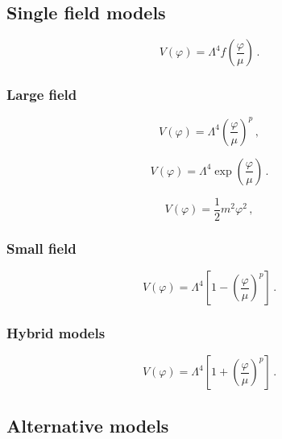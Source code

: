 \subsection{Single field models} 
\label{subsection:2.4.1}

\begin{equation}
V(\varphi) = \Lambda^4 f\left(\frac{\varphi}{\mu}\right)\, .
\label{equation:2.4.1}
\end{equation}  

\subsubsection{Large field}
\label{subsubsection:2.4.1.1}

\begin{equation}
V(\varphi) = \Lambda^4 \left( \frac{\varphi}{\mu} \right)^p \, ,
\label{equation:2.4.2}
\end{equation}     

\begin{equation}
V(\varphi) = \Lambda^4 \exp \left( \frac{\varphi}{\mu} \right) \, .
\label{equation:2.4.3}
\end{equation}

\begin{equation}
V(\varphi) = \frac{1}{2} m^2 \varphi^2 \, ,
\label{equation:2.4.4}
\end{equation} 

\subsubsection{Small field}
\label{subsubsection:2.4.1.2}

\begin{equation}
V(\varphi) = \Lambda^4 \left[ 1 - \left( \frac{\varphi}{\mu} \right)^p \right] \, .
\label{equation:2.4.5}
\end{equation}

\subsubsection{Hybrid models}
\label{subsubsection:2.4.1.3}

\begin{equation}
V(\varphi) = \Lambda^4 \left[ 1 + \left( \frac{\varphi}{\mu} \right)^p \right] \, .
\label{equation:2.4.6}
\end{equation}

\subsection{Alternative models}
\label{subsection:2.4.2}

